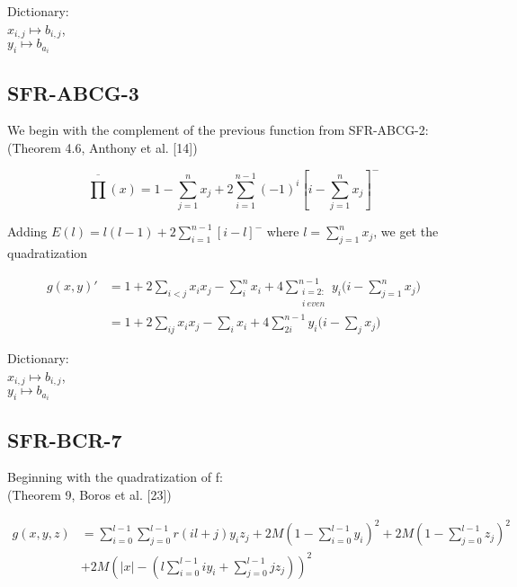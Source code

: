 \documentclass[a4paper,11pt]{article}
\begin{document}
\noindent Dictionary:\\
$x_{i,j}\mapsto b_{i,j}$,\\
$y_{i}\mapsto b_{a_i}$\\



\subsection{SFR-ABCG-3}
We begin with the complement of the previous function from SFR-ABCG-2:
\\(Theorem 4.6, Anthony et al. [14])

\begin{equation}
  \overline{\prod}(x) = 1 - \sum_{j=1}^n x_j + 2\sum_{i=1}^{n-1}(-1)^{i}\left[i - \sum_{j=1}^{n}x_j\right]^-
\end{equation}

\noindent Adding $E(l) = l(l-1) + 2\sum_{i=1}^{n-1}\left[i-l\right]^-$ where $l = \sum_{j=1}^n x_j$, we get the quadratization

\begin{equation}
\begin{split}
  \left.
  g(x,y)'
  \right.
  &= 1 + 2\sum_{i<j}x_ix_j - \sum_{i}^n x_i + 4\sum_{\substack{i = 2:\\ i\:even}}^{n-1}y_i\Big(i - \sum_{j=1}^n x_j\Big)\\
  &= 1 + 2\sum_{ij}x_ix_j - \sum_{i} x_i + 4\sum_{2i}^{n-1}y_i\Big(i - \sum_{j} x_j\Big)
  \end{split}
\end{equation}

\noindent Dictionary:\\
$x_{i,j}\mapsto b_{i,j}$,\\
$y_{i}\mapsto b_{a_i}$\\



\subsection{SFR-BCR-7}

Beginning with the quadratization of f:
\\(Theorem 9, Boros et al. [23])

\begin{equation}
  \begin{split}
  \left.
  g(x,y,z)
  \right.
  &= \sum_{i=0}^{l-1}\sum_{j=0}^{l-1}r(il+j)y_iz_j
  + 2M\left(1-\sum_{i=0}^{l-1}y_i\right)^2 + 2M\left(1-\sum_{j=0}^{l-1}z_j\right)^2\\
  &+ 2M\left(|x| - \left(l\sum_{i=0}^{l-1}iy_i + \sum_{j=0}^{l-1}jz_j\right)\right)^2
  \end{split}
\end{equation}
\end{document}
